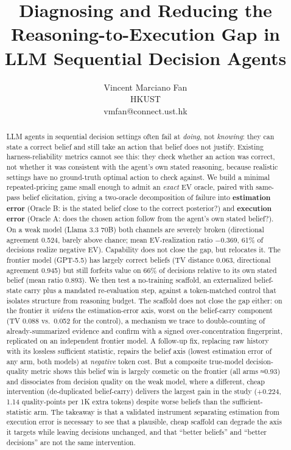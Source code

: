 \documentclass[
  11pt,
]{article}
\title{Diagnosing and Reducing the Reasoning-to-Execution Gap in LLM Sequential Decision Agents}
\author{Vincent Marciano Fan\\
HKUST\\
vmfan@connect.ust.hk}
\date{}
\begin{document}
\maketitle
\begin{abstract}
LLM agents in sequential decision settings often fail at \emph{doing}, not \emph{knowing}: they can state a correct belief and still take an action that belief does not justify. Existing harness-reliability metrics cannot see this: they check whether an action was correct, not whether it was consistent with the agent's own stated reasoning, because realistic settings have no ground-truth optimal action to check against. We build a minimal repeated-pricing game small enough to admit an \emph{exact} EV oracle, paired with same-pass belief elicitation, giving a two-oracle decomposition of failure into \textbf{estimation error} (Oracle B: is the stated belief close to the correct posterior?) and \textbf{execution error} (Oracle A: does the chosen action follow from the agent's own stated belief?). On a weak model (Llama 3.3 70B) both channels are severely broken (directional agreement 0.524, barely above chance; mean EV-realization ratio −0.369, 61\% of decisions realize negative EV). Capability does not close the gap, but relocates it. The frontier model (GPT-5.5) has largely correct beliefs (TV distance 0.063, directional agreement 0.945) but still forfeits value on 66\% of decisions relative to its own stated belief (mean ratio 0.893). We then test a no-training scaffold, an externalized belief-state carry plus a mandated re-evaluation step, against a token-matched control that isolates structure from reasoning budget. The scaffold does not close the gap either: on the frontier it \emph{widens} the estimation-error axis, worst on the belief-carry component (TV 0.088 vs.~0.052 for the control), a mechanism we trace to double-counting of already-summarized evidence and confirm with a signed over-concentration fingerprint, replicated on an independent frontier model. A follow-up fix, replacing raw history with its lossless sufficient statistic, repairs the belief axis (lowest estimation error of any arm, both models) at \emph{negative} token cost. But a composite true-model decision-quality metric shows this belief win is largely cosmetic on the frontier (all arms ≈0.93) and dissociates from decision quality on the weak model, where a different, cheap intervention (de-duplicated belief-carry) delivers the largest gain in the study (+0.224, 1.14 quality-points per 1K extra tokens) despite worse beliefs than the sufficient-statistic arm. The takeaway is that a validated instrument separating estimation from execution error is necessary to see that a plausible, cheap scaffold can degrade the axis it targets while leaving decisions unchanged, and that ``better beliefs'' and ``better decisions'' are not the same intervention.
\end{abstract}
\end{document}
